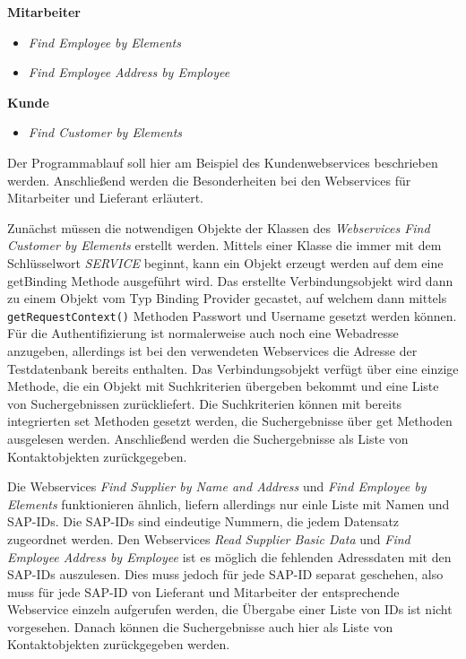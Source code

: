 \textbf{Mitarbeiter}
\begin{itemize}
\item \emph{Find Employee by Elements}
\item \emph{Find Employee Address by Employee}
\end{itemize}

\textbf{Kunde}
\begin{itemize}
\item \emph{Find Customer by Elements}
\end{itemize}

Der Programmablauf soll hier am Beispiel des Kundenwebservices beschrieben werden. Anschließend werden die Besonderheiten
bei den Webservices für Mitarbeiter und Lieferant erläutert.

Zunächst müssen die notwendigen Objekte der Klassen des \emph{Webservices Find Customer by Elements} erstellt werden. Mittels
einer Klasse die immer mit dem Schlüsselwort \emph{SERVICE} beginnt, kann ein Objekt erzeugt werden auf dem eine getBinding Methode
ausgeführt wird. Das erstellte Verbindungsobjekt wird dann zu einem Objekt vom Typ Binding Provider gecastet, auf welchem dann
mittels \lstinline{getRequestContext()} Methoden Passwort und Username gesetzt werden können. Für die Authentifizierung ist normalerweise
auch noch eine Webadresse anzugeben, allerdings ist bei den verwendeten Webservices die Adresse der Testdatenbank bereits 
enthalten. Das Verbindungsobjekt verfügt über eine einzige Methode, die ein Objekt mit Suchkriterien übergeben bekommt 
und eine Liste von Suchergebnissen zurückliefert. Die Suchkriterien können mit bereits integrierten set Methoden gesetzt werden,
die Suchergebnisse über get Methoden ausgelesen werden. Anschließend werden die Suchergebnisse als Liste von Kontaktobjekten
zurückgegeben.

Die Webservices \emph{Find Supplier by Name and Address} und \emph{Find Employee by Elements} funktionieren ähnlich, liefern allerdings nur 
einle Liste mit Namen und SAP-IDs. Die SAP-IDs sind eindeutige Nummern, die jedem Datensatz zugeordnet werden. Den Webservices
\emph{Read Supplier Basic Data} und \emph{Find Employee Address by Employee} ist es möglich die fehlenden Adressdaten mit den SAP-IDs 
auszulesen. Dies muss jedoch für jede SAP-ID separat geschehen, also muss für jede SAP-ID von Lieferant und Mitarbeiter der
entsprechende Webservice einzeln aufgerufen werden, die Übergabe einer Liste von IDs ist nicht vorgesehen. Danach können 
die Suchergebnisse auch hier als Liste von Kontaktobjekten zurückgegeben werden.


